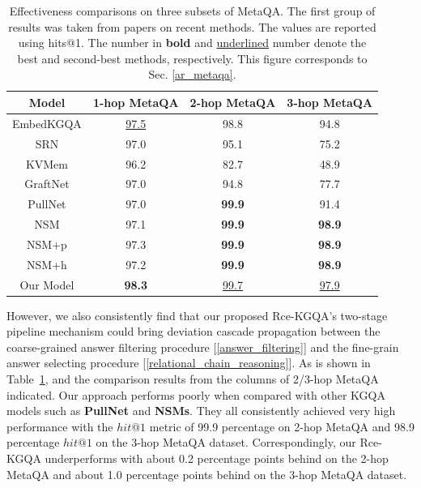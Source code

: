 \documentclass[pdflatex,sn-mathphys]{sn-jnl}%
\theoremstyle{thmstyleone}%
\theoremstyle{thmstyletwo}%
\theoremstyle{thmstylethree}%
\begin{document}
\begin{table}[h]
    \centering
    \begin{tabular}{c|ccc} \hline
        Model & 1-hop MetaQA & 2-hop MetaQA & 3-hop MetaQA\\ \hline
        EmbedKGQA & \underline{97.5} & 98.8 & 94.8 \\
        SRN & 97.0 & 95.1 & 75.2 \\
        KVMem & 96.2 & 82.7 & 48.9 \\
        GraftNet & 97.0 & 94.8 & 77.7 \\
        PullNet & 97.0 & \bf{99.9} & 91.4 \\ \hline
        NSM & 97.1 & \bf{99.9} & \bf{98.9} \\ 
        NSM+p & 97.3 & \bf{99.9} & \bf{98.9} \\ 
        NSM+h & 97.2 & \bf{99.9} & \bf{98.9} \\ \hline
        Our Model  & \bf{98.3} & \underline{99.7} & \underline{97.9} \\ \hline
    \end{tabular}
    \caption{Effectiveness comparisons on three subsets of MetaQA. The first group of results was taken from papers on recent methods. The values are reported using hits@1. The number in \textbf{bold} and \underline{underlined} number denote the best and second-best methods, respectively. This figure corresponds to Sec. \ref{ar_metaqa}.}
    \label{comparison_sota_metaqa}
\end{table}


However, we also consistently find that our proposed Rce-KGQA's two-stage pipeline mechanism could bring deviation cascade propagation between the coarse-grained answer filtering procedure [\ref{answer_filtering}] and the fine-grain answer selecting procedure [\ref{relational_chain_reasoning}]. As is shown in Table~\ref{comparison_sota_metaqa}, and the comparison results from the columns of 2/3-hop MetaQA indicated. Our approach performs poorly when compared with other KGQA models such as \textbf{PullNet} and \textbf{NSMs}. They all consistently achieved very high performance with the $hit@1$ metric of 99.9 percentage on 2-hop MetaQA and 98.9 percentage $hit@1$ on the 3-hop MetaQA dataset. Correspondingly, our Rce-KGQA underperforms with about 0.2 percentage points behind on the 2-hop MetaQA and about 1.0 percentage points behind on the 3-hop MetaQA dataset. %
\end{document}
